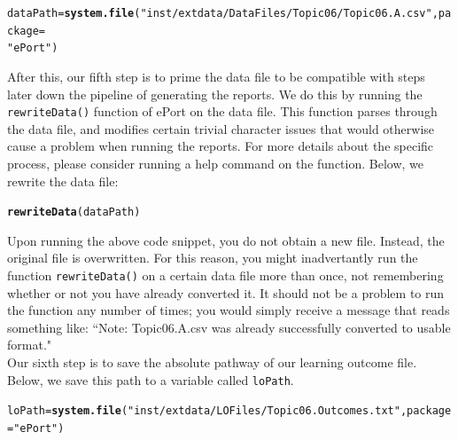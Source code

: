 \documentclass{article}\usepackage[]{graphicx}\usepackage[]{color}
\makeatletter
\newcommand{\hlstr}[1]{\textcolor[rgb]{0.192,0.494,0.8}{#1}}%
\newcommand{\hlstd}[1]{\textcolor[rgb]{0.345,0.345,0.345}{#1}}%
\newcommand{\hlkwb}[1]{\textcolor[rgb]{0.69,0.353,0.396}{#1}}%
\newcommand{\hlkwc}[1]{\textcolor[rgb]{0.333,0.667,0.333}{#1}}%
\newcommand{\hlkwd}[1]{\textcolor[rgb]{0.737,0.353,0.396}{\textbf{#1}}}%
\newenvironment{kframe}{%
 \def\at@end@of@kframe{}%
 \ifinner\ifhmode%
  \def\at@end@of@kframe{\end{minipage}}%
  \begin{minipage}{\columnwidth}%
 \fi\fi%
 \def\FrameCommand##1{\hskip\@totalleftmargin \hskip-\fboxsep
 \colorbox{shadecolor}{##1}\hskip-\fboxsep
     \hskip-\linewidth \hskip-\@totalleftmargin \hskip\columnwidth}%
 \MakeFramed {\advance\hsize-\width
   \@totalleftmargin\z@ \linewidth\hsize
   \@setminipage}}%
 {\par\unskip\endMakeFramed%
 \at@end@of@kframe}
\newenvironment{knitrout}{}{} %
\numberwithin{equation}{section} %
\makeatother
\begin{document}
\begin{knitrout}
\color{fgcolor}\begin{kframe}
\begin{alltt}
\hlstd{dataPath} \hlkwb{=} \hlkwd{system.file}\hlstd{(}\hlstr{"inst/extdata/DataFiles/Topic06/Topic06.A.csv"}\hlstd{,} \hlkwc{package} \hlstd{=}
  \hlstr{"ePort"}\hlstd{)}
\end{alltt}
\end{kframe}
\end{knitrout}

After this, our fifth step is to prime the data file to be compatible with steps later down the pipeline of generating the reports. We do this by running the \texttt{rewriteData()} function of ePort on the data file. This function parses through the data file, and modifies certain trivial character issues that would otherwise cause a problem when running the reports. For more details about the specific process, please consider running a help command on the function. Below, we rewrite the data file:

\begin{knitrout}
\color{fgcolor}\begin{kframe}
\begin{alltt}
\hlkwd{rewriteData}\hlstd{(dataPath)}
\end{alltt}
\end{kframe}
\end{knitrout}

Upon running the above code snippet, you do not obtain a new file. Instead, the original file is overwritten. For this reason, you might inadvertantly run the function \texttt{rewriteData()} on a certain data file more than once, not remembering whether or not you have already converted it. It should not be a problem to run the function any number of times; you would simply receive a message that reads something like: ``Note: Topic06.A.csv was already successfully converted to usable format."\\

Our sixth step is to save the absolute pathway of our learning outcome file. Below, we save this path to a variable called \texttt{loPath}.

\begin{knitrout}
\color{fgcolor}\begin{kframe}
\begin{alltt}
\hlstd{loPath} \hlkwb{=} \hlkwd{system.file}\hlstd{(}\hlstr{"inst/extdata/LOFiles/Topic06.Outcomes.txt"}\hlstd{,} \hlkwc{package} \hlstd{=} \hlstr{"ePort"}\hlstd{)}
\end{alltt}
\end{kframe}
\end{knitrout}
\end{document}
